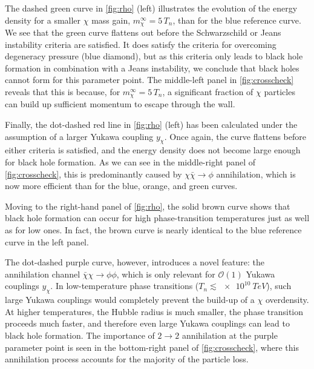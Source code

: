 \documentclass[
onecolumn, %
11pt, %
tightenlines,
superscriptaddress, %
nofootinbib, %
preprintnumbers, %
prd %
]{revtex4-1}
\begin{document}
The dashed green curve in \cref{fig:rho} (left) illustrates the evolution of the energy density for a smaller $\chi$ mass gain, $m_\chi^\infty = 5\,T_n$, than for the blue reference curve.  We see that the green curve flattens out before the Schwarzschild or Jeans instability criteria are satisfied. It does satisfy the criteria for overcoming degeneracy pressure (blue diamond), but as this criteria only leads to black hole formation in combination with a Jeans instability, we conclude that black holes cannot form for this parameter point. The middle-left panel in \cref{fig:crosscheck} reveals that this is because, for $m_\chi^\infty = 5\,T_n$, a significant fraction of $\chi$ particles can build up sufficient momentum to escape through the wall.

Finally, the dot-dashed red line in \cref{fig:rho} (left) has been calculated under the assumption of a larger Yukawa coupling $y_\chi$.  Once again, the curve flattens before either criteria is satisfied, and the energy density does not become large enough for black hole formation.  As we can see in the middle-right panel of \cref{fig:crosscheck}, this is predominantly caused by $\chi\bar\chi \to \phi$ annihilation, which is now more efficient than for the blue, orange, and green curves.

Moving to the right-hand panel of \cref{fig:rho}, the solid brown curve shows that black hole formation can occur for high phase-transition temperatures just as well as for low ones. In fact, the brown curve is nearly identical to the blue reference curve in the left panel.

The dot-dashed purple curve, however, introduces a novel feature: the annihilation channel $\bar\chi \chi \to \phi\phi$, which is only relevant for $\mathcal{O}(1)$ Yukawa couplings $y_\chi$. In low-temperature phase transitions ($T_n \lesssim \SI{e10}{TeV}$), such large Yukawa couplings would completely prevent the build-up of a $\chi$ overdensity. At higher temperatures, the Hubble radius is much smaller, the phase transition proceeds much faster, and therefore even large Yukawa couplings can lead to black hole formation. The importance of $2 \to 2$ annihilation at the purple parameter point is seen in the bottom-right panel of \cref{fig:crosscheck}, where this annihilation process accounts for the majority of the particle loss.
\end{document}
